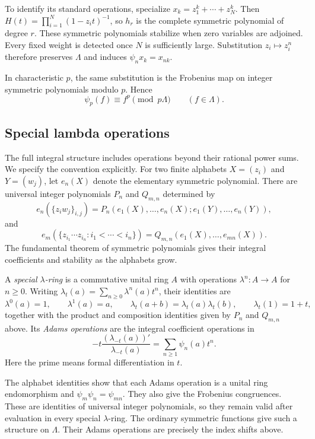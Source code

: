 To identify its standard operations, specialize
$x_k=z_1^k+\cdots+z_N^k$.
Then $H(t)=\prod_{i=1}^N(1-z_it)^{-1}$, so $h_r$ is the complete
symmetric polynomial of degree $r$.
These symmetric polynomials stabilize when zero variables are adjoined.
Every fixed weight is detected once $N$ is sufficiently large.
Substitution $z_i\mapsto z_i^n$ therefore preserves $\Lambda$
and induces $\psi_nx_k=x_{nk}$.

In characteristic $p$, the same substitution is the Frobenius map
on integer symmetric polynomials modulo $p$. Hence
\begin{equation}
 \label{v4-arith:hecke:eq:frobenius}
 \psi_p(f)\equiv f^p\pmod{p\Lambda}\qquad(f\in\Lambda).
\end{equation}

\subsection{Special lambda operations}

The full integral structure includes operations beyond their rational
power sums. We specify the convention explicitly.
For two finite alphabets $X=(z_i)$ and $Y=(w_j)$, let $e_n(X)$
denote the elementary symmetric polynomial.
There are universal integer polynomials $P_n$ and $Q_{m,n}$ determined by
\[
 e_n(\{z_iw_j\}_{i,j})
 =P_n(e_1(X),\ldots,e_n(X);e_1(Y),\ldots,e_n(Y)),
\]
and
\[
 e_m(\{z_{i_1}\cdots z_{i_n}:i_1<\cdots<i_n\})
 =Q_{m,n}(e_1(X),\ldots,e_{mn}(X)).
\]
The fundamental theorem of symmetric polynomials gives their integral
coefficients and stability as the alphabets grow.

\begin{definition}
\label{v4-arith:hecke:def:lambda}
A \emph{special $\lambda$-ring} is a commutative unital ring $A$
with operations $\lambda^n:A\to A$ for $n\geq0$.
Writing $\lambda_t(a)=\sum_{n\geq0}\lambda^n(a)t^n$, their identities are
\[
 \lambda^0(a)=1,\qquad \lambda^1(a)=a,\qquad
 \lambda_t(a+b)=\lambda_t(a)\lambda_t(b),\qquad
 \lambda_t(1)=1+t,
\]
together with the product and composition identities given by
$P_n$ and $Q_{m,n}$ above.
Its \emph{Adams operations} are the integral coefficient operations in
\[
 -t\frac{(\lambda_{-t}(a))'}{\lambda_{-t}(a)}
 =\sum_{n\geq1}\psi_n(a)t^n.
\]
Here the prime means formal differentiation in $t$.
\end{definition}

The alphabet identities show that each Adams operation is a unital
ring endomorphism and $\psi_m\psi_n=\psi_{mn}$.
They also give the Frobenius congruences.
These are identities of universal integer polynomials, so they remain
valid after evaluation in every special $\lambda$-ring.
The ordinary symmetric functions give such a structure on $\Lambda$.
Their Adams operations are precisely the index shifts above.

